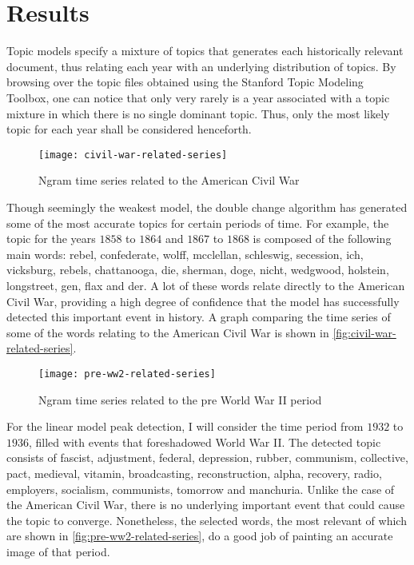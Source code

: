 \chapter{Results}
\label{chapter:results}

Topic models specify a mixture of topics that generates each historically relevant document, thus relating each year with an underlying distribution of topics. By browsing over the topic files obtained using the Stanford Topic Modeling Toolbox, one can notice that only very rarely is a year associated with a topic mixture in which there is no single dominant topic. Thus, only the most likely topic for each year shall be considered henceforth.

\begin{figure}
\centering
\texttt{[image: civil-war-related-series]}
\caption{Ngram time series related to the American Civil War}
\label{fig:civil-war-related-series}
\end{figure}

Though seemingly the weakest model, the double change algorithm has generated some of the most accurate topics for certain periods of time. For example, the topic for the years $1858$ to $1864$ and $1867$ to $1868$ is composed of the following main words: rebel, confederate, wolff, mcclellan, schleswig, secession, ich, vicksburg, rebels, chattanooga, die, sherman, doge, nicht, wedgwood, holstein, longstreet, gen, flax and der. A lot of these words relate directly to the American Civil War, providing a high degree of confidence that the model has successfully detected this important event in history. A graph comparing the time series of some of the words relating to the American Civil War is shown in \autoref{fig:civil-war-related-series}.

\begin{figure}
\centering
\texttt{[image: pre-ww2-related-series]}
\caption{Ngram time series related to the pre World War II period}
\label{fig:pre-ww2-related-series}
\end{figure}

For the linear model peak detection, I will consider the time period from $1932$ to $1936$, filled with events that foreshadowed World War II. The detected topic consists of fascist, adjustment, federal, depression, rubber, communism, collective, pact, medieval, vitamin, broadcasting, reconstruction, alpha, recovery, radio, employers, socialism, communists, tomorrow and manchuria. Unlike the case of the American Civil War, there is no underlying important event that could cause the topic to converge. Nonetheless, the selected words, the most relevant of which are shown in \autoref{fig:pre-ww2-related-series}, do a good job of painting an accurate image of that period.

